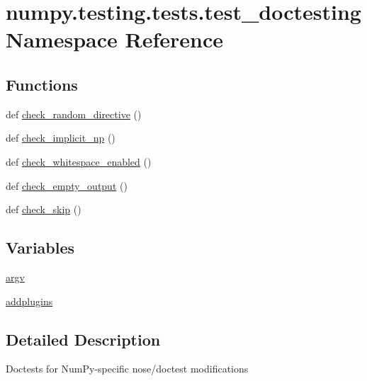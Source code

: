 \hypertarget{namespacenumpy_1_1testing_1_1tests_1_1test__doctesting}{}\section{numpy.\+testing.\+tests.\+test\+\_\+doctesting Namespace Reference}
\label{namespacenumpy_1_1testing_1_1tests_1_1test__doctesting}
\subsection*{Functions}
\begin{DoxyCompactItemize}
\item 
def \hyperlink{namespacenumpy_1_1testing_1_1tests_1_1test__doctesting_a0d185b8906cf32b100dd60d1ef8ce783}{check\+\_\+random\+\_\+directive} ()
\item 
def \hyperlink{namespacenumpy_1_1testing_1_1tests_1_1test__doctesting_ae7d8a01857a6b1605092d87e42554cd5}{check\+\_\+implicit\+\_\+np} ()
\item 
def \hyperlink{namespacenumpy_1_1testing_1_1tests_1_1test__doctesting_afe7bd5096e554bc027047a45ccd9f37f}{check\+\_\+whitespace\+\_\+enabled} ()
\item 
def \hyperlink{namespacenumpy_1_1testing_1_1tests_1_1test__doctesting_ad4a1a46dd1de4b1a792ac4e3794313fd}{check\+\_\+empty\+\_\+output} ()
\item 
def \hyperlink{namespacenumpy_1_1testing_1_1tests_1_1test__doctesting_a81d316ca9b5292162920514934c23c08}{check\+\_\+skip} ()
\end{DoxyCompactItemize}
\subsection*{Variables}
\begin{DoxyCompactItemize}
\item 
\hyperlink{namespacenumpy_1_1testing_1_1tests_1_1test__doctesting_ad639f892029816d01ff8a34a82602acb}{argv}
\item 
\hyperlink{namespacenumpy_1_1testing_1_1tests_1_1test__doctesting_a8a0fb3e04d0d1258529f99e7b35ec9fc}{addplugins}
\end{DoxyCompactItemize}


\subsection{Detailed Description}
\begin{DoxyVerb}Doctests for NumPy-specific nose/doctest modifications\end{DoxyVerb}
 

